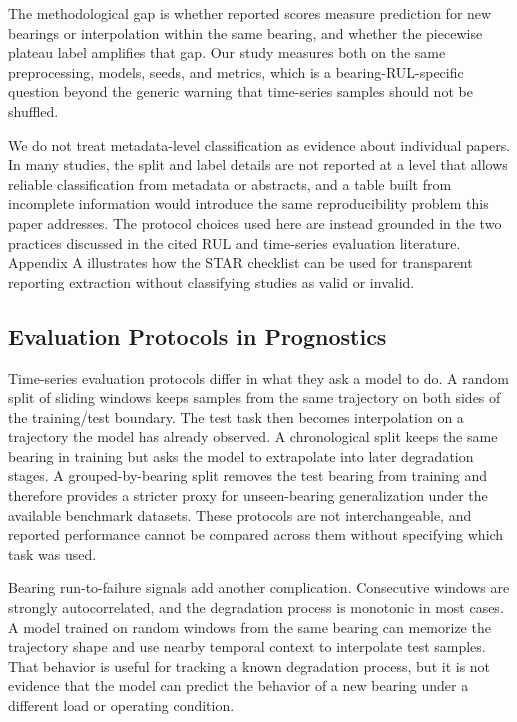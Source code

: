 \documentclass[pdflatex,sn-mathphys-num]{sn-jnl}
\begin{document}
The methodological gap is whether reported scores measure prediction for new bearings or interpolation within the same bearing, and whether the piecewise plateau label amplifies that gap. Our study measures both on the same preprocessing, models, seeds, and metrics, which is a bearing-RUL-specific question beyond the generic warning that time-series samples should not be shuffled.

We do not treat metadata-level classification as evidence about individual papers. In many studies, the split and label details are not reported at a level that allows reliable classification from metadata or abstracts, and a table built from incomplete information would introduce the same reproducibility problem this paper addresses. The protocol choices used here are instead grounded in the two practices discussed in the cited RUL and time-series evaluation literature. Appendix A illustrates how the STAR checklist can be used for transparent reporting extraction without classifying studies as valid or invalid.

\subsection{Evaluation Protocols in Prognostics}
Time-series evaluation protocols differ in what they ask a model to do. A random split of sliding windows keeps samples from the same trajectory on both sides of the training/test boundary. The test task then becomes interpolation on a trajectory the model has already observed. A chronological split keeps the same bearing in training but asks the model to extrapolate into later degradation stages. A grouped-by-bearing split removes the test bearing from training and therefore provides a stricter proxy for unseen-bearing generalization under the available benchmark datasets. These protocols are not interchangeable, and reported performance cannot be compared across them without specifying which task was used.

Bearing run-to-failure signals add another complication. Consecutive windows are strongly autocorrelated, and the degradation process is monotonic in most cases. A model trained on random windows from the same bearing can memorize the trajectory shape and use nearby temporal context to interpolate test samples. That behavior is useful for tracking a known degradation process, but it is not evidence that the model can predict the behavior of a new bearing under a different load or operating condition.
\end{document}
